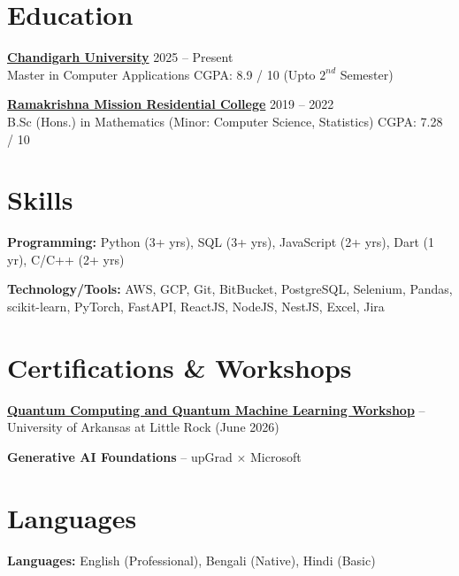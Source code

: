 \documentclass[a4paper,10pt]{article}
\begin{document}
\section*{Education}

\textbf{\href{https://www.onlinecu.in/}{Chandigarh University}} \hfill 2025 -- Present\\
Master in Computer Applications \hfill CGPA: 8.9 / 10 (Upto $2^{nd}$ Semester)

\vspace{4pt}

\textbf{\href{https://rkmrc.in/}{Ramakrishna Mission Residential College}} \hfill 2019 -- 2022\\
B.Sc (Hons.) in Mathematics (Minor: Computer Science, Statistics) \hfill CGPA: 7.28 / 10

\section*{Skills}

\textbf{Programming:} Python (3+ yrs), SQL (3+ yrs), JavaScript (2+ yrs), Dart (1 yr), C/C++ (2+ yrs)

\vspace{2pt}

\textbf{Technology/Tools:} AWS, GCP, Git, BitBucket, PostgreSQL, Selenium, Pandas, scikit-learn, PyTorch, FastAPI, ReactJS, NodeJS, NestJS, Excel, Jira

\section*{Certifications \& Workshops}

\begin{experiencelist}
\item \textbf{\href{https://credentials.ualr.edu/9f6ca551-6a9f-4f1c-88cf-dd1efb2c23b1}{Quantum Computing and Quantum Machine Learning Workshop}} -- University of Arkansas at Little Rock (June 2026)
\item \textbf{Generative AI Foundations} -- upGrad $\times$ Microsoft
\end{experiencelist}

\section*{Languages}

\textbf{Languages:} English (Professional), Bengali (Native), Hindi (Basic)
\end{document}
